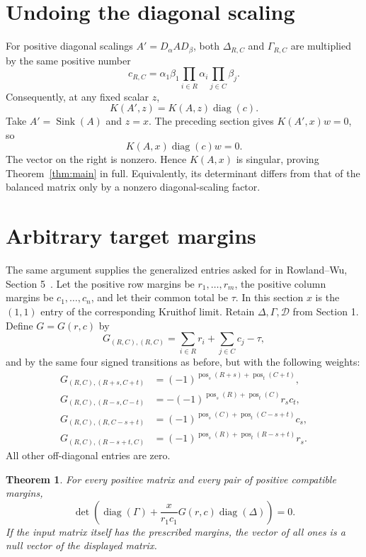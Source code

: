 \documentclass[11pt]{article}
\newtheorem{theorem}{Theorem}
\newcommand{\diag}{\operatorname{diag}}
\newcommand{\pos}{\operatorname{pos}}
\newcommand{\Sink}{\operatorname{Sink}}
\newcommand{\D}{\mathcal D}
\begin{document}
\section{Undoing the diagonal scaling}
For positive diagonal scalings $A'=D_\alpha A D_\beta$, both $\Delta_{R,C}$ and $\Gamma_{R,C}$ are multiplied by the same positive number
\[
 c_{R,C}=\alpha_1\beta_1\prod_{i\in R}\alpha_i\prod_{j\in C}\beta_j.
\]
Consequently, at any fixed scalar $z$,
\[
 K(A',z)=K(A,z)\diag(c).
\]
Take $A'=\Sink(A)$ and $z=x$. The preceding section gives $K(A',x)w=0$, so
\[
 K(A,x)\diag(c)w=0.
\]
The vector on the right is nonzero. Hence $K(A,x)$ is singular, proving Theorem~\ref{thm:main} in full. Equivalently, its determinant differs from that of the balanced matrix only by a nonzero diagonal-scaling factor.

\section{Arbitrary target margins}
The same argument supplies the generalized entries asked for in Rowland--Wu, Section 5~\cite{rw}. Let the positive row margins be $r_1,\ldots,r_m$, the positive column margins be $c_1,\ldots,c_n$, and let their common total be $\tau$. In this section $x$ is the $(1,1)$ entry of the corresponding Kruithof limit. Retain $\Delta,\Gamma,\D$ from Section 1. Define $G=G(r,c)$ by
\[
 G_{(R,C),(R,C)}=\sum_{i\in R}r_i+\sum_{j\in C}c_j-\tau,
\]
and by the same four signed transitions as before, but with the following weights:
\begin{align*}
 G_{(R,C),(R+s,C+t)}&=(-1)^{\pos_s(R+s)+\pos_t(C+t)},\\
 G_{(R,C),(R-s,C-t)}&=-(-1)^{\pos_s(R)+\pos_t(C)}r_s c_t,\\
 G_{(R,C),(R,C-s+t)}&=(-1)^{\pos_s(C)+\pos_t(C-s+t)}c_s,\\
 G_{(R,C),(R-s+t,C)}&=(-1)^{\pos_s(R)+\pos_t(R-s+t)}r_s.
\end{align*}
All other off-diagonal entries are zero.
\begin{theorem}\label{thm:margins}
For every positive matrix and every pair of positive compatible margins,
\[
 \det\left(\diag(\Gamma)+\frac{x}{r_1c_1}G(r,c)\diag(\Delta)\right)=0.
\]
If the input matrix itself has the prescribed margins, the vector of all ones is a null vector of the displayed matrix.
\end{theorem}
\end{document}
